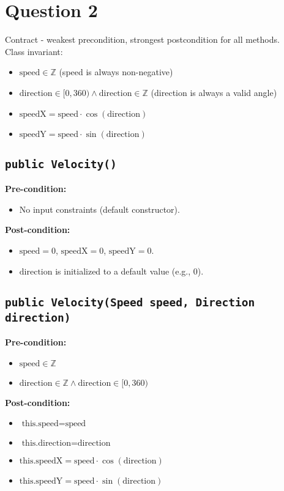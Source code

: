\documentclass{article}
\begin{document}
\section*{Question 2}

Contract - weakest precondition, strongest postcondition for all methods. \\

Class invariant:
\begin{itemize}
    \item \( \text{speed} \in \mathbb{Z} \) (speed is always non-negative)
    \item \( \text{direction} \in [0,360) \wedge \text{direction} \in \mathbb{Z} \) (direction is always a valid angle)
    \item \( \text{speedX} = \text{speed} \cdot \cos(\text{direction}) \)
    \item \( \text{speedY} = \text{speed} \cdot \sin(\text{direction}) \)
\end{itemize}


\subsection*{\texttt{public Velocity()}}
\textbf{Pre-condition:}
\begin{itemize}
    \item No input constraints (default constructor).
\end{itemize}

\textbf{Post-condition:}
\begin{itemize}
    \item \( \text{speed} = 0 \), \( \text{speedX} = 0 \), \( \text{speedY} = 0 \).
    \item \( \text{direction} \) is initialized to a default value (e.g., 0).
\end{itemize}


\subsection*{\texttt{public Velocity(Speed speed, Direction direction)}}
\textbf{Pre-condition:}
\begin{itemize}
    \item \( \text{speed} \in \mathbb{Z} \)
    \item \( \text{direction} \in \mathbb{Z} \wedge \text{direction} \in [0,360) \)
\end{itemize}

\textbf{Post-condition:}
\begin{itemize}
    \item \( \text{this.speed} = \text{speed} \)
    \item \( \text{this.direction} = \text{direction} \)
    \item \( \text{this.speedX} = \text{speed} \cdot \cos(\text{direction}) \)
    \item \( \text{this.speedY} = \text{speed} \cdot \sin(\text{direction}) \)
\end{itemize}
\end{document}
